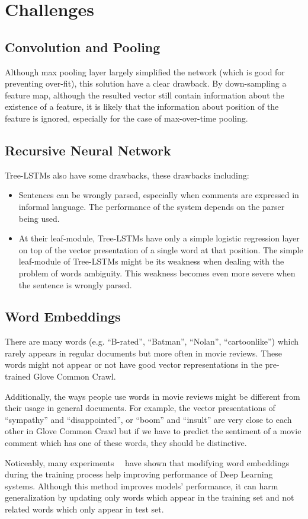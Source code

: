 \section{Challenges}
\subsection{Convolution and Pooling}
Although max pooling layer largely simplified the network (which is good for preventing over-fit), this solution have a clear drawback.
By down-sampling a feature map, although the resulted vector still contain information about the existence of a feature, it is likely that the information about position of the feature is ignored, especially for the case of max-over-time pooling.
\subsection{Recursive Neural Network}
Tree-LSTMs also have some drawbacks, these drawbacks including:
\begin{itemize}
	\item Sentences can be wrongly parsed, especially when comments are expressed in informal language.
	The performance of the system depends on the parser being used.
	\item At their leaf-module, Tree-LSTMs have only a simple logistic regression layer on top of the vector presentation of a single word at that position.
	The simple leaf-module of Tree-LSTMs might be its weakness when dealing with the problem of words ambiguity.
	This weakness becomes even more severe when the sentence is wrongly parsed. 
\end{itemize}
\subsection{Word Embeddings}
There are many words (e.g. ``B-rated'', ``Batman'', ``Nolan'', ``cartoonlike'') which rarely appears in regular documents but more often in movie reviews.
These words might not appear or not have good vector representations in the pre-trained Glove Common Crawl.

Additionally, the ways people use words in movie reviews might be different from their usage in general documents.
For example, the vector presentations of ``sympathy'' and ``disappointed'', or ``boom'' and ``insult'' are very close to each other in Glove Common Crawl but if we have to predict the sentiment of a movie comment which has one of these words, they should be distinctive.

Noticeably, many experiments~\cite{treeLSTM}~\cite{KimCNN} have shown that modifying word embeddings during the training process help improving performance of Deep Learning systems.
Although this method improves models' performance, it can harm generalization by updating only words which appear in the training set and not related words which only appear in test set.